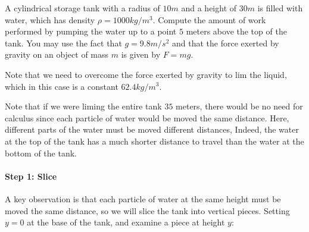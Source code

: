 \documentclass{ximera}
\begin{document}
\begin{example}
  A cylindrical storage tank with a radius of $10 \unit{m}$ and a height of $30\unit{m}$ is filled with water, which has density
$\rho=1000 \unit{kg}/\unit{m}^3$. Compute the amount of work performed by pumping the water up to a point $5$ meters above the top of the tank.  You may use the fact that $g=9.8m/s^2$ and that the force exerted by gravity on an object of mass $m$ is given by $F=mg$.
  \begin{explanation}
  

Note that we need to overcome the force exerted by gravity to lim the liquid, which in this case is a constant $62.4 \unit{kg}/\unit{m}^3$.

\begin{multipleChoice}
\end{multipleChoice}

Note that if we were liming the entire tank $35$ meters, there would be no need for calculus since each particle of water would be moved the same distance.  Here, different parts of the water must be moved different distances,  Indeed,  the water at the top of the tank has a much shorter distance to travel than the water at the bottom of the tank.
	
\paragraph{Step 1: Slice}  A key observation is that each particle of water at the same height must be moved the same distance, so we will slice the tank into vertical pieces.  Setting $y=0$ at the base of the tank, and examine a piece at height $y$:


\end{explanation}
\end{example}
\end{document}
